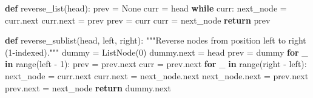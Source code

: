 \documentclass[11pt]{article}
\newenvironment{Shaded}{\begin{snugshade}}{\end{snugshade}}
\newcommand{\BuiltInTok}[1]{\textcolor[rgb]{0.50,0.55,0.55}{#1}}
\newcommand{\CommentTok}[1]{\textcolor[rgb]{0.48,0.49,0.49}{#1}}
\newcommand{\ControlFlowTok}[1]{\textcolor[rgb]{0.99,0.74,0.29}{\textbf{#1}}}
\newcommand{\DecValTok}[1]{\textcolor[rgb]{0.96,0.45,0.00}{#1}}
\newcommand{\KeywordTok}[1]{\textcolor[rgb]{0.81,0.81,0.76}{\textbf{#1}}}
\newcommand{\NormalTok}[1]{\textcolor[rgb]{0.81,0.81,0.76}{#1}}
\newcommand{\OperatorTok}[1]{\textcolor[rgb]{0.81,0.81,0.76}{#1}}
\newcommand{\VariableTok}[1]{\textcolor[rgb]{0.15,0.68,0.68}{#1}}
\begin{document}
\begin{Shaded}
\begin{Highlighting}[]
\KeywordTok{def}\NormalTok{ reverse\_list(head):}
\NormalTok{    prev }\OperatorTok{=} \VariableTok{None}
\NormalTok{    curr }\OperatorTok{=}\NormalTok{ head}
    \ControlFlowTok{while}\NormalTok{ curr:}
\NormalTok{        next\_node }\OperatorTok{=}\NormalTok{ curr.}\BuiltInTok{next}
\NormalTok{        curr.}\BuiltInTok{next} \OperatorTok{=}\NormalTok{ prev}
\NormalTok{        prev }\OperatorTok{=}\NormalTok{ curr}
\NormalTok{        curr }\OperatorTok{=}\NormalTok{ next\_node}
    \ControlFlowTok{return}\NormalTok{ prev}

\KeywordTok{def}\NormalTok{ reverse\_sublist(head, left, right):}
    \CommentTok{"""Reverse nodes from position left to right (1{-}indexed)."""}
\NormalTok{    dummy }\OperatorTok{=}\NormalTok{ ListNode(}\DecValTok{0}\NormalTok{)}
\NormalTok{    dummy.}\BuiltInTok{next} \OperatorTok{=}\NormalTok{ head}
\NormalTok{    prev }\OperatorTok{=}\NormalTok{ dummy}
    \ControlFlowTok{for}\NormalTok{ \_ }\KeywordTok{in} \BuiltInTok{range}\NormalTok{(left }\OperatorTok{{-}} \DecValTok{1}\NormalTok{):}
\NormalTok{        prev }\OperatorTok{=}\NormalTok{ prev.}\BuiltInTok{next}
\NormalTok{    curr }\OperatorTok{=}\NormalTok{ prev.}\BuiltInTok{next}
    \ControlFlowTok{for}\NormalTok{ \_ }\KeywordTok{in} \BuiltInTok{range}\NormalTok{(right }\OperatorTok{{-}}\NormalTok{ left):}
\NormalTok{        next\_node }\OperatorTok{=}\NormalTok{ curr.}\BuiltInTok{next}
\NormalTok{        curr.}\BuiltInTok{next} \OperatorTok{=}\NormalTok{ next\_node.}\BuiltInTok{next}
\NormalTok{        next\_node.}\BuiltInTok{next} \OperatorTok{=}\NormalTok{ prev.}\BuiltInTok{next}
\NormalTok{        prev.}\BuiltInTok{next} \OperatorTok{=}\NormalTok{ next\_node}
    \ControlFlowTok{return}\NormalTok{ dummy.}\BuiltInTok{next}


\end{Highlighting}
\end{Shaded}
\end{document}
